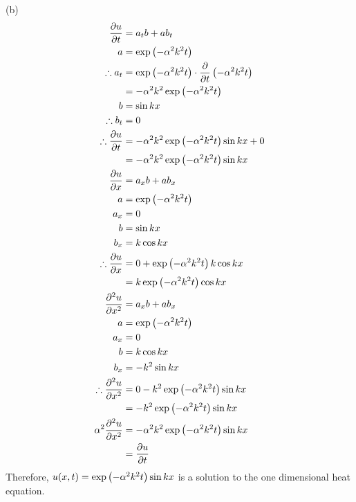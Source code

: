 \documentclass[a4paper, 11pt]{report}
\begin{document}
\newpage
\sol (b)
\begin{align*}
	\frac{\partial u}{\partial t} &= a_tb + ab_t \\
	a &= \exp\left( -\alpha^2k^2t \right) \\
	\therefore a_t &= \exp\left( -\alpha^2k^2t \right) \cdot \frac{\partial }{\partial t}\left( -\alpha^2k^2t \right) \\
		&= -\alpha^2k^2 \exp\left( -\alpha^2k^2t \right) \\
	b &= \sin kx \\
	\therefore b_t &= 0 \\
	\therefore\frac{\partial u}{\partial t} &= -\alpha^2k^2 \exp\left( -\alpha^2k^2t \right)\sin kx + 0 \\
		&= -\alpha^2k^2 \exp\left( -\alpha^2k^2t \right) \sin kx \\
	\frac{\partial u}{\partial x} &= a_xb + ab_x \\
	a &= \exp\left( -\alpha^2k^2t \right) \\
	a_x &= 0 \\
	b &= \sin kx \\
	b_x &= k\cos kx \\
	\therefore\frac{\partial u}{\partial x} &= 0 + \exp\left( -\alpha^2k^2t \right) k\cos kx \\
		&= k \exp\left( -\alpha^2k^2t \right) \cos kx \\
	\frac{\partial ^2u}{\partial x^2} &= a_xb + ab_x \\
	a &= \exp\left( -\alpha^2k^2t \right) \\
	a_x &= 0 \\
	b &= k\cos kx \\
	b_x &= -k^2\sin kx \\
	\therefore\frac{\partial ^2u}{\partial x^2} &= 0 - k^2 \exp\left( -\alpha^2k^2t \right) \sin kx \\
		&= -k^2 \exp\left( -\alpha^2k^2t \right) \sin kx \\
	\alpha^2\frac{\partial ^2u}{\partial x^2} &= -\alpha^2 k^2 \exp\left( -\alpha^2k^2t \right) \sin kx \\
		&= \frac{\partial u}{\partial t}
\end{align*}
Therefore, $u(x,t) = \exp\left( -\alpha^2k^2t \right)\sin kx$ is a solution to the one dimensional heat equation. \\
\end{document}
